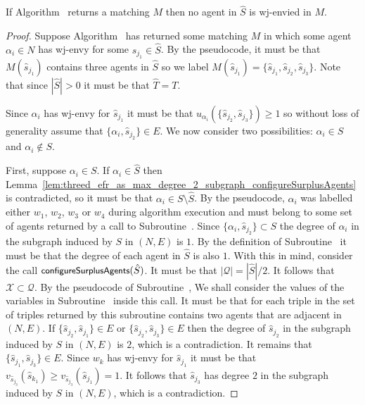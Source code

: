 \begin{lem}
\label{lem:threed_efr_as_wjenvy_max_deg_2_no_agent_in_Uhat_is_wjenvied}
If Algorithm~ returns a matching $M$ then no agent in $\hat{S}$ is wj-envied in $M$.
\end{lem}
\begin{proof}
Suppose Algorithm~ has returned some matching $M$ in which some agent $\alpha_i \in N$ has wj-envy for some $\hat{s}_{j_1} \in \hat{S}$. By the pseudocode, it must be that $M(\hat{s}_{j_1})$ contains three agents in $\hat{S}$ so we label $M(\hat{s}_{j_1}) = \{ \hat{s}_{j_1}, \hat{s}_{j_2}, \hat{s}_{j_3} \}$. Note that since $|\hat{S}| > 0$ it must be that $\hat{T} = T$.

Since $\alpha_i$ has wj-envy for $\hat{s}_{j_1}$ it must be that $u_{\alpha_i}(\{ \hat{s}_{j_2}, \hat{s}_{j_3} \}) \geq 1$ so without loss of generality assume that $\{ \alpha_i, \hat{s}_{j_2} \} \in E$.  We now consider two possibilities: $\alpha_i \in S$ and $\alpha_i \notin S$.

First, suppose $\alpha_i \in S$. If $\alpha_i \in \hat{S}$ then Lemma~\ref{lem:threed_efr_as_max_degree_2_subgraph_configureSurplusAgents} is contradicted, so it must be that $\alpha_i \in S \setminus \hat{S}$. By the pseudocode, $\alpha_i$ was labelled either $w_1$, $w_2$, $w_3$ or $w_4$ during algorithm execution and must belong to some set of agents returned by a call to Subroutine~. Since $\{ \alpha_i, \hat{s}_{j_2}  \} \subset S$ the degree of $\alpha_i$ in the subgraph induced by $S$ in $(N, E)$ is $1$. By the definition of Subroutine~ it must be that the degree of each agent in $\hat{S}$ is also $1$. With this in mind, consider the call $\algorithmfont{configureSurplusAgents}(\hat{S})$. It must be that $|\mathcal{Q}| = |\hat{S}|/2$. It follows that $\mathcal{X} \subset \mathcal{Q}$. By the pseudocode of Subroutine~, We shall consider the values of the variables in Subroutine~ inside this call. It must be that for each triple in the set of triples returned by this subroutine contains two agents that are adjacent in $(N, E)$. If $\{ \hat{s}_{j_2}, \hat{s}_{j_1} \} \in E$ or $\{ \hat{s}_{j_2}, \hat{s}_{j_3} \} \in E$ then the degree of $\hat{s}_{j_2}$ in the subgraph induced by $S$ in $(N, E)$ is $2$, which is a contradiction. It remains that $\{ \hat{s}_{j_1}, \hat{s}_{j_3} \} \in E$. Since $w_k$ has wj-envy for $\hat{s}_{j_1}$ it must be that $v_{\hat{s}_{j_3}}(\hat{s}_{k_1}) \geq v_{\hat{s}_{j_3}}(\hat{s}_{j_1}) = 1$. It follows that $\hat{s}_{j_3}$ has degree $2$ in the subgraph induced by $S$ in $(N, E)$, which is a contradiction.


\end{proof}
